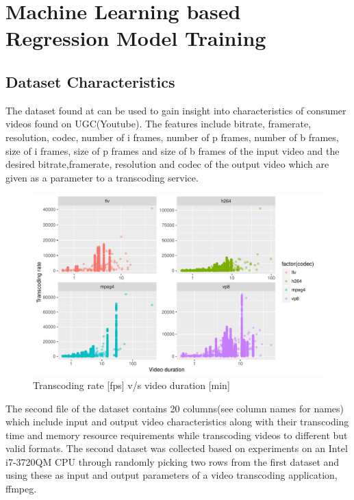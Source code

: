 \documentclass[letterpaper,12pt,titlepage,oneside,final]{report}
\begin{document}
\chapter{Machine Learning based Regression Model Training}
    \section{Dataset Characteristics}
        The dataset found at \cite{UCIM53:online} can be used to gain insight into characteristics of consumer videos found on UGC(Youtube). The features include bitrate, framerate, resolution, codec, number of i frames, number of p frames, number of b frames, size of i frames, size of p frames and size of b frames of the input video and the desired bitrate,framerate, resolution and codec of the output video which are given as a parameter to a transcoding service.

        \begin{figure}[!h]
            \centering
            \includegraphics[width=\textwidth]{dur_vs_trate}
            \caption{Transcoding rate [fps] v/s video duration [min]}
            \label{dur_vs_trate}
        \end{figure}

        The second file of the dataset contains 20 columns(see column names for names) which include input and output video characteristics along with their transcoding time and memory resource requirements while transcoding videos to different but valid formats. The second dataset was collected based on experiments on an Intel i7-3720QM CPU through randomly picking two rows from the first dataset and using these as input and output parameters of a video transcoding application, ffmpeg.
\end{document}
